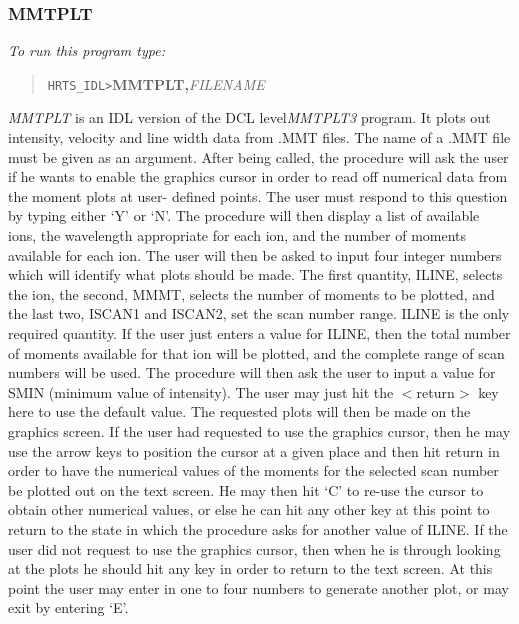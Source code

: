 \subsubsection{MMTPLT}                                                            

{\em To run this program type:}                                               
\begin{quote}
{\tt HRTS\_IDL>}{\bf MMTPLT,}{\it FILENAME}                                        
\end{quote}
{\em MMTPLT} is an
IDL version of the DCL level{\em  MMTPLT3} program.  It plots out intensity,
velocity and line width data from .MMT files.  The name of a .MMT file must be
given as an argument.  After being called, the procedure will ask the user if
he wants to enable the graphics cursor in order to read off numerical data from
the moment plots at user- defined points.  The user must respond to this
question by typing either `Y' or `N'.  The procedure will then display a list
of available ions, the wavelength appropriate for each ion, and the number of
moments available for each ion.  The user will then be asked to input four
integer numbers which will identify what plots should be made. The first
quantity, ILINE, selects the ion, the second, MMMT, selects the number of
moments to be plotted, and the last two, ISCAN1 and ISCAN2, set the scan number
range. ILINE is the only required quantity. If the user just enters a value for
ILINE, then the total number of moments available for that ion will be plotted,
and the complete range of scan numbers will be used.  The procedure will then
ask the user to input a value for SMIN (minimum value of intensity).  The user
may just hit the $<$return$>$ key here to use the default value.  The requested 
plots
will then be made on the graphics screen.  If the user had requested to use the
graphics cursor, then he may use the arrow keys to position the cursor at a
given place and then hit return in order to have the numerical values of the
moments for the selected scan number be plotted out on the text screen.  He may
then hit `C' to re-use the cursor to obtain other numerical values, or else he
can hit any other key at this point to return to the state in which the
procedure asks for another value of ILINE.  If the user did not request to use
the graphics cursor, then when he is through looking at the plots he should hit
any key in order to return to the text screen.  At this point the user may
enter in one to four numbers to generate another plot, or may exit by entering
`E'.                                                                           

